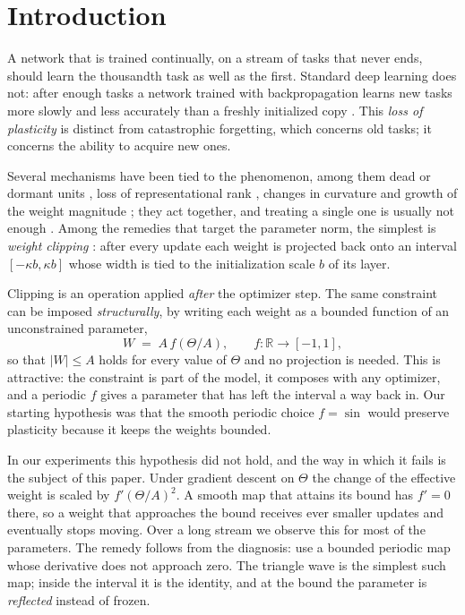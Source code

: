 \documentclass[11pt,a4paper]{article}
\begin{document}
\section{Introduction}

A network that is trained continually, on a stream of tasks that never ends, should learn the thousandth task
as well as the first. Standard deep learning does not: after enough tasks a network trained with
backpropagation learns new tasks more slowly and less accurately than a freshly initialized copy
\citep{ash2020warm,dohare2021continual,lyle2023understanding,dohare2024loss}. This \emph{loss of plasticity}
is distinct from catastrophic forgetting, which concerns old tasks; it concerns the ability to acquire new ones.

Several mechanisms have been tied to the phenomenon, among them dead or dormant units
\citep{sokar2023dormant,abbas2023loss}, loss of representational rank \citep{lyle2022understanding,dohare2024loss},
changes in curvature \citep{lyle2023understanding,lewandowski2023directions} and growth of the weight
magnitude \citep{dohare2024loss,elsayed2024weight,lyle2024normalization}; they act together, and treating a single one is usually not
enough \citep{lyle2024disentangling}. Among the remedies that target the parameter norm, the simplest is
\emph{weight clipping} \citep{elsayed2024weight}: after every update each weight is projected back onto an
interval $[-\kappa b,\kappa b]$ whose width is tied to the initialization scale $b$ of its layer.

Clipping is an operation applied \emph{after} the optimizer step. The same constraint can be imposed
\emph{structurally}, by writing each weight as a bounded function of an unconstrained parameter,
\begin{equation}
  W \;=\; A\, f\!\left(\Theta/A\right), \qquad f:\mathbb{R}\to[-1,1], \label{eq:reparam}
\end{equation}
so that $|W|\le A$ holds for every value of $\Theta$ and no projection is needed. This is attractive: the
constraint is part of the model, it composes with any optimizer, and a periodic $f$ gives a parameter that
has left the interval a way back in. Our starting hypothesis was that the smooth periodic choice
$f=\sin$ would preserve plasticity because it keeps the weights bounded.

In our experiments this hypothesis did not hold, and the way in which it fails is the subject of this paper. Under gradient descent on
$\Theta$ the change of the effective weight is scaled by $f'(\Theta/A)^2$. A smooth map that attains its bound
has $f'=0$ there, so a weight that approaches the bound receives ever smaller updates and eventually
stops moving. Over a long stream we observe this for most of the parameters. The remedy follows from the diagnosis:
use a bounded periodic map whose derivative does not approach zero. The triangle wave is the simplest such map; inside
the interval it is the identity, and at the bound the parameter is \emph{reflected} instead of frozen.
\end{document}
